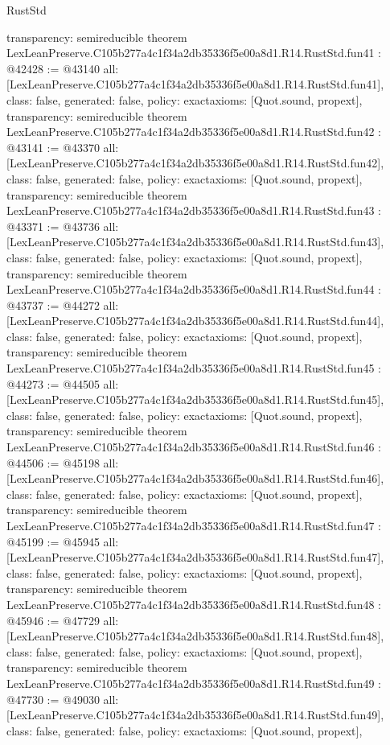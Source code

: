 \begin{lexlean}{RustStd}
\begin{coremodule}
{  transparency: semireducible
}
theorem LexLeanPreserve.C105b277a4c1f34a2db35336f5e00a8d1.R14.RustStd.fun41 : @42428 := @43140 {
  all: [LexLeanPreserve.C105b277a4c1f34a2db35336f5e00a8d1.R14.RustStd.fun41],
  class: false,
  generated: false,
  policy: exact{axioms: [Quot.sound, propext]},
  transparency: semireducible
}
theorem LexLeanPreserve.C105b277a4c1f34a2db35336f5e00a8d1.R14.RustStd.fun42 : @43141 := @43370 {
  all: [LexLeanPreserve.C105b277a4c1f34a2db35336f5e00a8d1.R14.RustStd.fun42],
  class: false,
  generated: false,
  policy: exact{axioms: [Quot.sound, propext]},
  transparency: semireducible
}
theorem LexLeanPreserve.C105b277a4c1f34a2db35336f5e00a8d1.R14.RustStd.fun43 : @43371 := @43736 {
  all: [LexLeanPreserve.C105b277a4c1f34a2db35336f5e00a8d1.R14.RustStd.fun43],
  class: false,
  generated: false,
  policy: exact{axioms: [Quot.sound, propext]},
  transparency: semireducible
}
theorem LexLeanPreserve.C105b277a4c1f34a2db35336f5e00a8d1.R14.RustStd.fun44 : @43737 := @44272 {
  all: [LexLeanPreserve.C105b277a4c1f34a2db35336f5e00a8d1.R14.RustStd.fun44],
  class: false,
  generated: false,
  policy: exact{axioms: [Quot.sound, propext]},
  transparency: semireducible
}
theorem LexLeanPreserve.C105b277a4c1f34a2db35336f5e00a8d1.R14.RustStd.fun45 : @44273 := @44505 {
  all: [LexLeanPreserve.C105b277a4c1f34a2db35336f5e00a8d1.R14.RustStd.fun45],
  class: false,
  generated: false,
  policy: exact{axioms: [Quot.sound, propext]},
  transparency: semireducible
}
theorem LexLeanPreserve.C105b277a4c1f34a2db35336f5e00a8d1.R14.RustStd.fun46 : @44506 := @45198 {
  all: [LexLeanPreserve.C105b277a4c1f34a2db35336f5e00a8d1.R14.RustStd.fun46],
  class: false,
  generated: false,
  policy: exact{axioms: [Quot.sound, propext]},
  transparency: semireducible
}
theorem LexLeanPreserve.C105b277a4c1f34a2db35336f5e00a8d1.R14.RustStd.fun47 : @45199 := @45945 {
  all: [LexLeanPreserve.C105b277a4c1f34a2db35336f5e00a8d1.R14.RustStd.fun47],
  class: false,
  generated: false,
  policy: exact{axioms: [Quot.sound, propext]},
  transparency: semireducible
}
theorem LexLeanPreserve.C105b277a4c1f34a2db35336f5e00a8d1.R14.RustStd.fun48 : @45946 := @47729 {
  all: [LexLeanPreserve.C105b277a4c1f34a2db35336f5e00a8d1.R14.RustStd.fun48],
  class: false,
  generated: false,
  policy: exact{axioms: [Quot.sound, propext]},
  transparency: semireducible
}
theorem LexLeanPreserve.C105b277a4c1f34a2db35336f5e00a8d1.R14.RustStd.fun49 : @47730 := @49030 {
  all: [LexLeanPreserve.C105b277a4c1f34a2db35336f5e00a8d1.R14.RustStd.fun49],
  class: false,
  generated: false,
  policy: exact{axioms: [Quot.sound, propext]},
}
\end{coremodule}
\end{lexlean}
